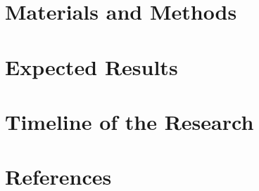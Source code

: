 \documentclass{article}
\begin{document}
\section{Materials and Methods}


\section{Expected Results}


\section{Timeline of the Research}



\section{References}
\end{document}
